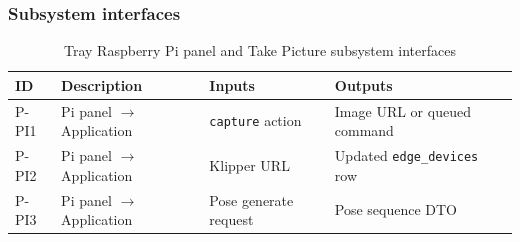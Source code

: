 \subsubsection{Subsystem interfaces}
\begin{table}[H]
\centering
\small
\begin{tabular}{|p{0.9cm}|p{3.4cm}|p{3.0cm}|p{3.5cm}|}
\hline
\textbf{ID} & \textbf{Description} & \textbf{Inputs} & \textbf{Outputs} \\
\hline
P-PI1 & Pi panel $\rightarrow$ Application & \texttt{capture} action & Image URL or queued command \\
\hline
P-PI2 & Pi panel $\rightarrow$ Application & Klipper URL & Updated \texttt{edge\_devices} row \\
\hline
P-PI3 & Pi panel $\rightarrow$ Application & Pose generate request & Pose sequence DTO \\
\hline
\end{tabular}
\caption{Tray Raspberry Pi panel and Take Picture subsystem interfaces}
\end{table}
